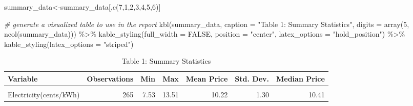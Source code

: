 \documentclass[
]{article}
\newenvironment{Shaded}{\begin{snugshade}}{\end{snugshade}}
\newcommand{\AttributeTok}[1]{\textcolor[rgb]{0.77,0.63,0.00}{#1}}
\newcommand{\CommentTok}[1]{\textcolor[rgb]{0.56,0.35,0.01}{\textit{#1}}}
\newcommand{\ConstantTok}[1]{\textcolor[rgb]{0.00,0.00,0.00}{#1}}
\newcommand{\DecValTok}[1]{\textcolor[rgb]{0.00,0.00,0.81}{#1}}
\newcommand{\FunctionTok}[1]{\textcolor[rgb]{0.00,0.00,0.00}{#1}}
\newcommand{\NormalTok}[1]{#1}
\newcommand{\OtherTok}[1]{\textcolor[rgb]{0.56,0.35,0.01}{#1}}
\newcommand{\SpecialCharTok}[1]{\textcolor[rgb]{0.00,0.00,0.00}{#1}}
\newcommand{\StringTok}[1]{\textcolor[rgb]{0.31,0.60,0.02}{#1}}
\begin{document}
\begin{Shaded}
\begin{Highlighting}[]
\NormalTok{summary\_data}\OtherTok{\textless{}{-}}\NormalTok{summary\_data[,}\FunctionTok{c}\NormalTok{(}\DecValTok{7}\NormalTok{,}\DecValTok{1}\NormalTok{,}\DecValTok{2}\NormalTok{,}\DecValTok{3}\NormalTok{,}\DecValTok{4}\NormalTok{,}\DecValTok{5}\NormalTok{,}\DecValTok{6}\NormalTok{)]}


\CommentTok{\# generate a visualized table to use in the report}
\FunctionTok{kbl}\NormalTok{(summary\_data,}
    \AttributeTok{caption =} \StringTok{"Table 1: Summary Statistics"}\NormalTok{,}
    \AttributeTok{digits =} \FunctionTok{array}\NormalTok{(}\DecValTok{5}\NormalTok{, }\FunctionTok{ncol}\NormalTok{(summary\_data))) }\SpecialCharTok{\%\textgreater{}\%} 
  \FunctionTok{kable\_styling}\NormalTok{(}\AttributeTok{full\_width =} \ConstantTok{FALSE}\NormalTok{, }\AttributeTok{position =} \StringTok{"center"}\NormalTok{, }
                \AttributeTok{latex\_options =} \StringTok{"hold\_position"}\NormalTok{) }\SpecialCharTok{\%\textgreater{}\%} 
  \FunctionTok{kable\_styling}\NormalTok{(}\AttributeTok{latex\_options =} \StringTok{"striped"}\NormalTok{)}
\end{Highlighting}
\end{Shaded}

\begin{table}[!h]

\caption{\label{tab:unnamed-chunk-1}Table 1: Summary Statistics}
\centering
\begin{tabular}[t]{l|r|r|r|r|r|r}
\hline
Variable & Observations & Min & Max & Mean Price & Std. Dev. & Median Price\\
\hline
\cellcolor{gray!6}{Natural Gas (\$/Mcf)} & \cellcolor{gray!6}{410} & \cellcolor{gray!6}{5.54} & \cellcolor{gray!6}{30.43} & \cellcolor{gray!6}{13.78} & \cellcolor{gray!6}{5.64} & \cellcolor{gray!6}{12.54}\\
\hline
Electricity(cents/kWh) & 265 & 7.53 & 13.51 & 10.22 & 1.30 & 10.41\\
\hline
\end{tabular}
\end{table}
\end{document}
